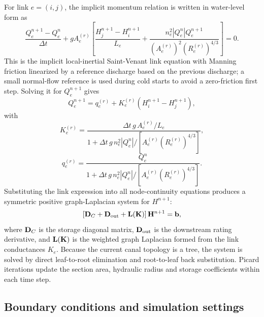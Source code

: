 For link \(e=(i,j)\), the implicit momentum relation is written in water-level
form as
\begin{equation}
    \frac{Q_e^{n+1}-Q_e^n}{\Delta t}
    +
    g A_e^{(r)}
    \left[
        \frac{H_j^{n+1}-H_i^{n+1}}{L_e}
        +
        \frac{
            n_e^2 |Q_e^n| Q_e^{n+1}
        }{
            \left(A_e^{(r)}\right)^2
            \left(R_e^{(r)}\right)^{4/3}
        }
    \right]
    =0 .
\end{equation}
This is the implicit local-inertial Saint-Venant link equation with Manning
friction linearized by a reference discharge based on the previous discharge;
a small normal-flow reference is used during cold starts to avoid a zero-friction
first step. Solving it for \(Q_e^{n+1}\) gives
\begin{equation}
    Q_e^{n+1}
    =
    q_e^{(r)}
    +
    K_e^{(r)}
    \left(
        H_i^{n+1}-H_j^{n+1}
    \right),
\end{equation}
with
\begin{equation}
    K_e^{(r)}
    =
    \frac{
        \Delta t\,g\,A_e^{(r)}/L_e
    }{
        1+
        \Delta t\,g\,n_e^2 |Q_e^n|
        /\left[
            A_e^{(r)}
            \left(R_e^{(r)}\right)^{4/3}
        \right]
    },
\end{equation}
\begin{equation}
    q_e^{(r)}
    =
    \frac{
        Q_e^n
    }{
        1+
        \Delta t\,g\,n_e^2 |Q_e^n|
        /\left[
            A_e^{(r)}
            \left(R_e^{(r)}\right)^{4/3}
        \right]
    } .
\end{equation}
Substituting the link expression into all node-continuity equations produces a
symmetric positive graph-Laplacian system for \(H^{n+1}\):
\begin{equation}
    \left[
        {\bf D}_C
        +
        {\bf D}_{\rm out}
        +
        {\bf L}({\bf K})
    \right]
    {\bf H}^{n+1}
    =
    {\bf b},
\end{equation}
where \({\bf D}_C\) is the storage diagonal matrix,
\({\bf D}_{\rm out}\) is the downstream rating derivative, and
\({\bf L}({\bf K})\) is the weighted graph Laplacian formed from the link
conductances \(K_e\). Because the current canal topology is a tree, the system
is solved by direct leaf-to-root elimination and root-to-leaf back substitution.
Picard iterations update the section area, hydraulic radius and storage
coefficients within each time step.

\subsection{Boundary conditions and simulation settings}


